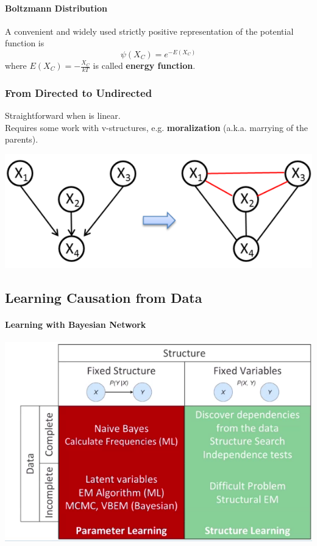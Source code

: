 \documentclass[10pt]{report}
\begin{document}
\paragraph{Boltzmann Distribution} A convenient and widely used strictly positive representation of the potential function is $$\psi(X_C)=e^{-E(X_C)}$$
where $E(X_C)=-\frac{X_C}{kT}$ is called \textbf{energy function}.
\subsubsection{From Directed to Undirected}
Straightforward when is linear.\\Requires some work with v-structures, e.g. \textbf{moralization} (a.k.a. marrying of the parents).\begin{center}
	\includegraphics[scale=0.5]{25.png}
\end{center}
\subsection{Learning Causation from Data}
\paragraph{Learning with Bayesian Network}
\begin{center}
	\includegraphics[scale=0.5]{26.png}
\end{center}
\end{document}
